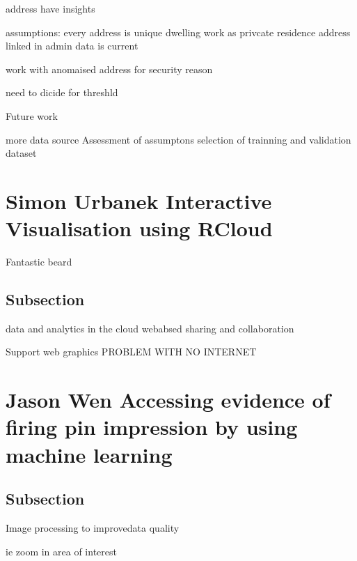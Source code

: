 \documentclass[
]{book}
\begin{document}
address have insights

assumptions: every address is unique
dwelling work as privcate residence
address linked in admin data is current

work with anomaised address for security reason

need to dicide for threshld

Future work

more data source
Assessment of assumptons
selection of trainning and validation dataset

\hypertarget{simon-urbanek-interactive-visualisation-using-rcloud}{%
\chapter*{Simon Urbanek \textbar{} Interactive Visualisation using RCloud}\label{simon-urbanek-interactive-visualisation-using-rcloud}}

Fantastic beard

\hypertarget{subsection}{%
\section{Subsection}\label{subsection}}

data and analytics in the cloud
webabsed
sharing and collaboration

Support web graphics
PROBLEM WITH NO INTERNET

\hypertarget{jason-wen-accessing-evidence-of-firing-pin-impression-by-using-machine-learning}{%
\chapter*{Jason Wen \textbar{} Accessing evidence of firing pin impression by using machine learning}\label{jason-wen-accessing-evidence-of-firing-pin-impression-by-using-machine-learning}}

\hypertarget{subsection}{%
\section{Subsection}\label{subsection}}

Image processing to improvedata quality

ie zoom in area of interest
\end{document}
